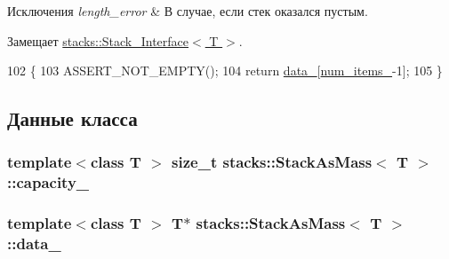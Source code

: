 \begin{DoxyExceptions}{Исключения}
{\em length\+\_\+error} & В случае, если стек оказался пустым. \\
\hline
\end{DoxyExceptions}


Замещает \hyperlink{classstacks_1_1_stack___interface_a367aa4742f24927015a2b9a396faee56}{stacks\+::\+Stack\+\_\+\+Interface$<$ T $>$}.


\begin{DoxyCode}
102                           \{
103         ASSERT\_NOT\_EMPTY();
104         \textcolor{keywordflow}{return} \hyperlink{classstacks_1_1_stack_as_mass_a1359a096829b400cd4d496cfe6e2fabc}{data\_}[\hyperlink{classstacks_1_1_stack_as_mass_a3adff034672496130598a225d4a4bc0f}{num\_items\_}-1];
105     \}
\end{DoxyCode}


\subsection{Данные класса}
\hypertarget{classstacks_1_1_stack_as_mass_ab49914ac7b7561f4187f1356a0a4e5ee}{}
\subsubsection[{capacity\+\_\+}]{\setlength{\rightskip}{0pt plus 5cm}template$<$class T $>$ size\+\_\+t {\bf stacks\+::\+Stack\+As\+Mass}$<$ T $>$\+::capacity\+\_\+\hspace{0.3cm}{\ttfamily [private]}}\label{classstacks_1_1_stack_as_mass_ab49914ac7b7561f4187f1356a0a4e5ee}
\hypertarget{classstacks_1_1_stack_as_mass_a1359a096829b400cd4d496cfe6e2fabc}{}
\subsubsection[{data\+\_\+}]{\setlength{\rightskip}{0pt plus 5cm}template$<$class T $>$ T$\ast$ {\bf stacks\+::\+Stack\+As\+Mass}$<$ T $>$\+::data\+\_\+\hspace{0.3cm}{\ttfamily [private]}}\label{classstacks_1_1_stack_as_mass_a1359a096829b400cd4d496cfe6e2fabc}
\hypertarget{classstacks_1_1_stack_as_mass_a3adff034672496130598a225d4a4bc0f}{}
